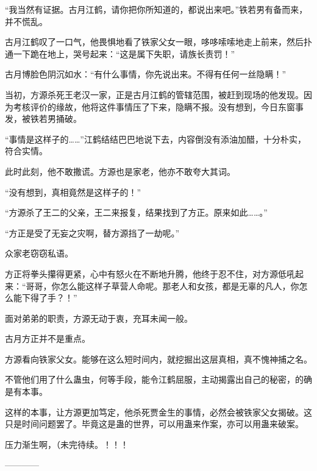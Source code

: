 \begin{this_body}
“我当然有证据。古月江鹤，请你把你所知道的，都说出来吧。”铁若男有备而来，并不慌乱。

古月江鹤叹了一口气，他畏惧地看了铁家父女一眼，哆哆嗦嗦地走上前来，然后扑通一下跪在地上，哭号起来：“这是属下失职，请族长责罚！”

古月博脸色阴沉如水：“有什么事情，你先说出来。不得有任何一丝隐瞒！”

当初，方源杀死王老汉一家，正是古月江鹤的管辖范围，被赶到现场的他发现。因为考核评价的缘故，他将这件事情压了下来，隐瞒不报。没有想到，今日东窗事发，被铁若男捅破。

“事情是这样子的……”江鹤结结巴巴地说下去，内容倒没有添油加醋，十分朴实，符合实情。

此时此刻，他不敢撒谎。方源也是家老，他亦不敢夸大其词。

“没有想到，真相竟然是这样子的！”

“方源杀了王二的父亲，王二来报复，结果找到了方正。原来如此……。”

“方正是受了无妄之灾啊，替方源挡了一劫呢。”

众家老窃窃私语。

方正将拳头攥得更紧，心中有怒火在不断地升腾，他终于忍不住，对方源低吼起来：“哥哥，你怎么能这样子草营人命呢。那老人和女孩，都是无辜的凡人，你怎么能下得了手？！”

面对弟弟的职责，方源无动于衷，充耳未闻一般。

古月方正并不是重点。

方源看向铁家父女。能够在这么短时间内，就挖掘出这层真相，真不愧神捕之名。

不管他们用了什么蛊虫，何等手段，能令江鹤屈服，主动揭露出自己的秘密，的确是有本事。

这样的本事，让方源更加笃定，他杀死贾金生的事情，必然会被铁家父女揭破。这只是时间问题罢了。毕竟这是蛊的世界，可以用蛊来作案，亦可以用蛊来破案。

压力渐生啊，（未完待续。！！！

------------

\end{this_body}

